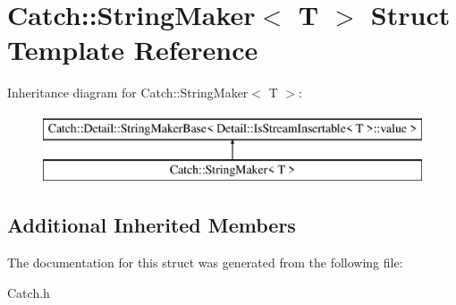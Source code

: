 \hypertarget{struct_catch_1_1_string_maker}{\section{Catch\-:\-:String\-Maker$<$ T $>$ Struct Template Reference}
\label{struct_catch_1_1_string_maker}
}
Inheritance diagram for Catch\-:\-:String\-Maker$<$ T $>$\-:\begin{figure}[H]
\begin{center}
\leavevmode
\includegraphics[height=2.000000cm]{struct_catch_1_1_string_maker}
\end{center}
\end{figure}
\subsection*{Additional Inherited Members}


The documentation for this struct was generated from the following file\-:\begin{DoxyCompactItemize}
\item 
Catch.\-h\end{DoxyCompactItemize}
